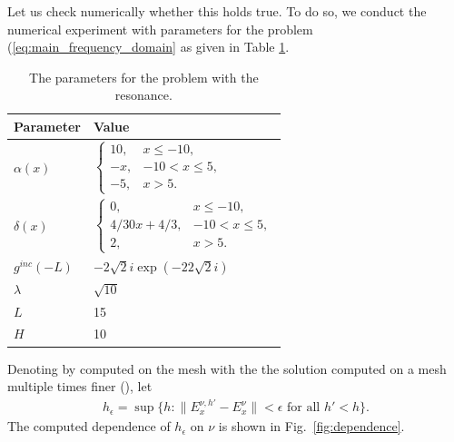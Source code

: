 Let us check numerically whether this holds true. 
To do so, we conduct the  numerical experiment with parameters for the problem (\ref{eq:main_frequency_domain} as given in Table \ref{tab:parameters}.
\begin{table}[htb!]
\begin{tabular}{l|l}
Parameter & Value \\
\hline
$\alpha(x)$ & $\left\{\begin{array}{lr}
10, & x\leq -10,\\
-x, & -10<x\leq 5,\\
-5, & x>5.
\end{array}\right.$ \\
$\delta(x)$ & 
$\left\{\begin{array}{lr}
0, & x\leq -10,\\
4/30x+4/3,& -10<x\leq 5,\\
2, & x>5.
\end{array}\right.$ \\
$g^{inc}(-L)$ & $-2 \sqrt{2}i\exp(-22\sqrt{2}i)$\\
$\lambda$ & 
$\sqrt{10}$\\
$L$& 15\\
$H$ & 10 \\
\end{tabular}
\caption{The parameters for the problem with the resonance.}
\label{tab:parameters}
\end{table}
Denoting by  computed on the mesh with the  the solution computed on a mesh multiple times finer (), let 
\begin{align}
\label{eq:def_epsilon}
h_{\epsilon}=\sup\{h: \|E_{x}^{\nu,h'}-E_{x}^{\nu}\|<\epsilon \text{ for all } h'<h\}.
\end{align}
The computed dependence of $h_{\epsilon}$ on $\nu$ is shown in Fig.~\ref{fig:dependence}.
